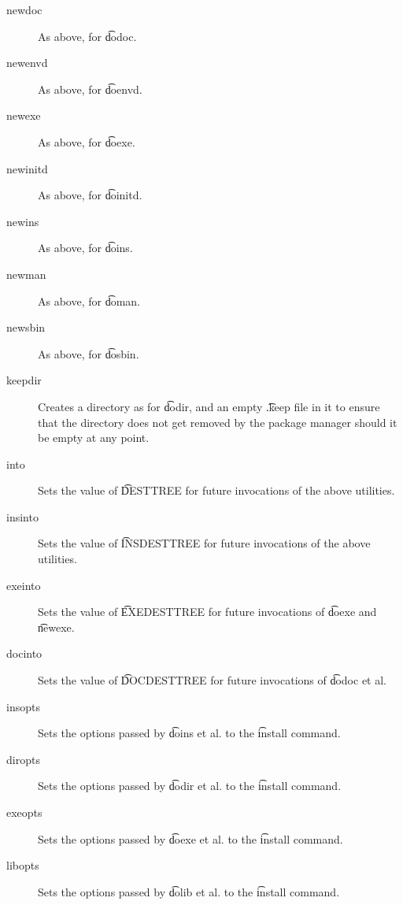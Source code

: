 \begin{description}
\item[newdoc] As above, for \t{dodoc}.

\item[newenvd] As above, for \t{doenvd}.

\item[newexe] As above, for \t{doexe}.

\item[newinitd] As above, for \t{doinitd}.

\item[newins] As above, for \t{doins}.

\item[newman] As above, for \t{doman}.

\item[newsbin] As above, for \t{dosbin}.

\item[keepdir] Creates a directory as for \t{dodir}, and an empty \t{.keep} file in it to ensure
    that the directory does not get removed by the package manager should it be empty at any point.

\item[into] Sets the value of \t{DESTTREE} for future invocations of the above utilities.

\item[insinto] Sets the value of \t{INSDESTTREE} for future invocations of the above utilities.

\item[exeinto] Sets the value of \t{EXEDESTTREE} for future invocations of \t{doexe} and \t{newexe}.

\item[docinto] Sets the value of \t{DOCDESTTREE} for future invocations of \t{dodoc} et al.

\item[insopts] Sets the options passed by \t{doins} et al. to the \t{install} command.

\item[diropts] Sets the options passed by \t{dodir} et al. to the \t{install} command.

\item[exeopts] Sets the options passed by \t{doexe} et al. to the \t{install} command.

\item[libopts] Sets the options passed by \t{dolib} et al. to the \t{install} command.

\end{description}

